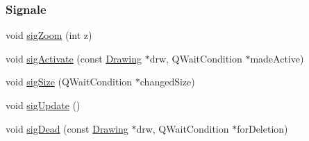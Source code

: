 \subsubsection*{Signale}
\begin{DoxyCompactItemize}
\item 
void \mbox{\hyperlink{classDrawOps_a42489500245289165f927bcd9891c9bf}{sig\+Zoom}} (int z)
\item 
void \mbox{\hyperlink{classDrawOps_a54f8abd3bf4ec1a3dbd22cdf6c1bd6b7}{sig\+Activate}} (const \mbox{\hyperlink{classDrawing}{Drawing}} $\ast$drw, Q\+Wait\+Condition $\ast$made\+Active)
\item 
void \mbox{\hyperlink{classDrawOps_a2e49eface451924dbcf4b5687285ab88}{sig\+Size}} (Q\+Wait\+Condition $\ast$changed\+Size)
\item 
void \mbox{\hyperlink{classDrawOps_a274f32dcc53300fc594ab5683a0e2071}{sig\+Update}} ()
\item 
void \mbox{\hyperlink{classDrawOps_ad121a0a6a2c1f022216b44159c022c0a}{sig\+Dead}} (const \mbox{\hyperlink{classDrawing}{Drawing}} $\ast$drw, Q\+Wait\+Condition $\ast$for\+Deletion)
\end{DoxyCompactItemize}
